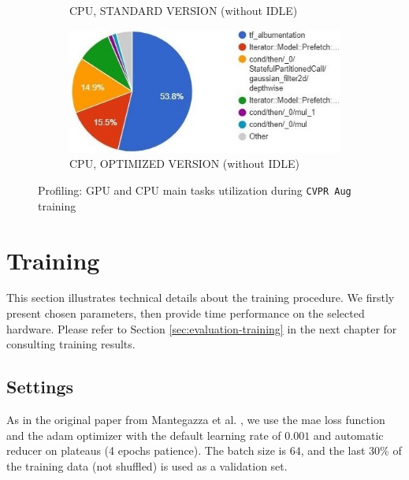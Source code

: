\begin{figure}[!h]
\begin{center}
\begin{subfigure}[h]{0.49\textwidth}
			\caption[]{CPU, STANDARD VERSION (without IDLE)}
		\end{subfigure}
		\hfill
		\begin{subfigure}[h]{0.49\textwidth}
			\centering
			\includegraphics[width=1\textwidth]{"contents/images/05-profiling-CVPRaug-opt-cpu"}
			\caption[]{CPU, OPTIMIZED VERSION (without IDLE)}
		\end{subfigure}
	\end{center}
	\caption[Profiling: GPU and CPU main tasks utilization during \texttt{CVPR Aug} training]{Profiling: GPU and CPU main tasks utilization during \texttt{CVPR Aug} training}
	\label{fig:profiling-cvpraug-gpu}
\end{figure}




\section{Training}
\label{sec:implementation-training}

This section illustrates technical details about the training procedure. We firstly present chosen parameters, then provide time performance on the selected hardware. Please refer to Section \ref{sec:evaluation-training} in the next chapter for consulting training results.



\subsection{Settings}
\label{subsec:training-params}


As in the original paper from Mantegazza et al. \cite{mantegazza2019visionbased}, we use the \gls{mae} loss function and the \gls{adam} optimizer \cite{kingma2014adam} with the default learning rate of $0.001$ and automatic reducer on plateaus (4 epochs patience). The batch size is $64$, and the last 30\% of the training data (not shuffled) is used as a validation set.

